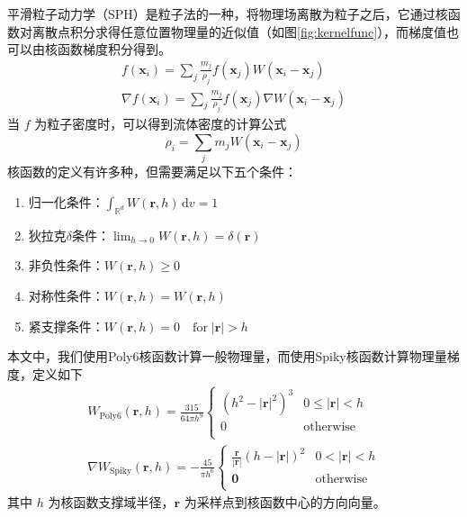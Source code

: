     平滑粒子动力学（SPH）是粒子法的一种，将物理场离散为粒子之后，它通过核函数对离散点积分求得任意位置物理量的近似值（如图\ref{fig:kernelfunc}），而梯度值也可以由核函数梯度积分得到。
    \begin{equation}
    	\begin{gathered}
    	f(\mathbf{x}_i) = \sum_j \frac{m_j}{\rho_j} f(\mathbf{x}_j) W(\mathbf{x}_i - \mathbf{x}_j)
    	\\
    	\nabla f(\mathbf{x}_i) = \sum_j \frac{m_j}{\rho_j} f(\mathbf{x}_j) \nabla W(\mathbf{x}_i - \mathbf{x}_j)
    	\end{gathered}
    \end{equation}
    当 $f$ 为粒子密度时，可以得到流体密度的计算公式
    \begin{equation}\label{eq:densfunc}
    	\rho_i = \sum_j m_j W(\mathbf{x}_i - \mathbf{x}_j)
    \end{equation}
    核函数的定义有许多种，但需要满足以下五个条件：
    \begin{enumerate}
    	\item 归一化条件：$\int_{\mathbb{R}^d} W(\mathbf r, h)\,\mathrm d v = 1$
    	\item 狄拉克$\delta$条件：$\lim_{h\rightarrow 0} W(\mathbf r, h) = \delta (\mathbf r)$
    	\item 非负性条件：$W(\mathbf r, h) \ge 0$
    	\item 对称性条件：$W(\mathbf r, h) = W(\mathbf r, h)$
    	\item 紧支撑条件：$W(\mathbf r, h) = 0 \quad \mathrm{for}\; |\mathbf r| > h$
    \end{enumerate}
    本文中，我们使用Poly6核函数计算一般物理量，而使用Spiky核函数计算物理量梯度\cite{MCG03SPH}，定义如下
    \begin{equation}
    	\begin{gathered}
    	W_{\mathrm{Poly6}}(\mathbf r, h) = \frac{315}{64 \pi h^9}
    	\left\{
    	\begin{array}{ll}
    	(h^2 - |\mathbf r|^2)^3 & 0 \le |\mathbf r| < h \\
    	0 & \mathrm{otherwise} \\
    	\end{array}
    	\right.
    	\\
    	\nabla W_{\mathrm{Spiky}}(\mathbf r, h) = -\frac{45}{\pi h^6}
    	\left\{
    	\begin{array}{ll}
    	\frac{\mathbf r}{|\mathbf r|} (h - |\mathbf r|)^2 & 0 < |\mathbf r| < h \\
    	\mathbf 0 & \mathrm{otherwise} \\
    	\end{array}
    	\right.
    	\end{gathered}
    \end{equation}
    其中 $h$ 为核函数支撑域半径，$\mathbf r$ 为采样点到核函数中心的方向向量。
    

